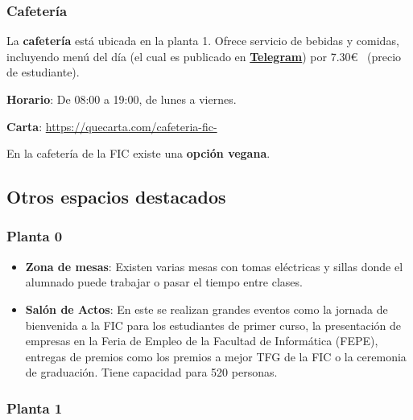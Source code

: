 
\subsubsection{Cafetería}

La \textbf{cafetería} está ubicada en la planta 1. Ofrece servicio de bebidas y comidas, incluyendo menú del día (el cual es publicado en \href{https://t.me/CafeteriaFIC}{\textbf{Telegram}}) por 7.30\euro~ (precio de estudiante).

\textbf{Horario}: De 08:00 a 19:00, de lunes a viernes.

\textbf{Carta}: \url{https://quecarta.com/cafeteria-fic-}

\begin{curiosityBox}
    En la cafetería de la \acrshort{FIC} existe una \textbf{opción vegana}.
\end{curiosityBox}

\subsection{Otros espacios destacados}

\subsubsection{Planta 0}

\begin{itemize}
    \item \textbf{Zona de mesas}: Existen varias mesas con tomas eléctricas y sillas donde el alumnado puede trabajar o pasar el tiempo entre clases.

    \item \textbf{Salón de Actos}: En este se realizan grandes eventos como la jornada de bienvenida a la \acrshort{FIC} para los estudiantes de primer curso, la presentación de empresas en la Feria de Empleo de la Facultad de Informática (\acrshort{FEPE}), entregas de premios como los premios a mejor \acrlong{TFG} de la \acrshort{FIC} o la ceremonia de graduación. Tiene capacidad para 520 personas.
\end{itemize}

\subsubsection{Planta 1}

